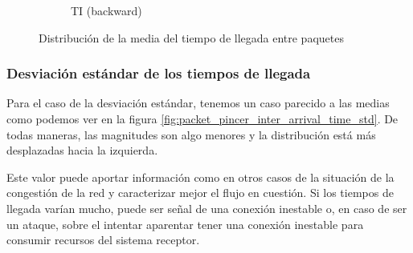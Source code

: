 \begin{figure}[H]
\begin{subfigure}[b]{0.32\textwidth}
        \caption{TI (backward)}
    \end{subfigure}
    \hfill
       \caption{Distribución de la media del tiempo de llegada entre paquetes}
       \label{fig:packet_pincer_inter_arrival_time_mean}
\end{figure}

\subsubsection{Desviación estándar de los tiempos de llegada}

Para el caso de la desviación estándar, tenemos un caso parecido a las medias como podemos ver en la figura \ref{fig:packet_pincer_inter_arrival_time_std}. De todas maneras, las magnitudes son algo menores y la distribución está más desplazadas hacia la izquierda. 

Este valor puede aportar información como en otros casos de la situación de la congestión de la red y caracterizar mejor el flujo en cuestión. Si los tiempos de llegada varían mucho, puede ser señal de una conexión inestable o, en caso de ser un ataque, sobre el intentar aparentar tener una conexión inestable para consumir recursos del sistema receptor.

